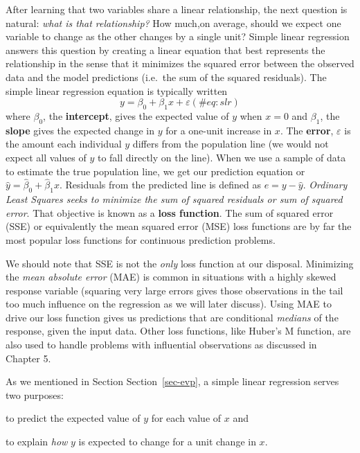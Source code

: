 \documentclass[
  letterpaper,
  DIV=11,
  numbers=noendperiod]{scrreprt}
\begin{document}
After learning that two variables share a linear relationship, the next
question is natural: \emph{what is that relationship?} How much,on
average, should we expect one variable to change as the other changes by
a single unit? Simple linear regression answers this question by
creating a linear equation that best represents the relationship in the
sense that it minimizes the squared error between the observed data and
the model predictions (i.e.~the sum of the squared residuals). The
simple linear regression equation is typically written \begin{equation}
y=\beta_0 + \beta_1x + \varepsilon
(\#eq:slr)
\end{equation} where \(\beta_0\), the \textbf{intercept}, gives the
expected value of \(y\) when \(x=0\) and \(\beta_1\), the \textbf{slope}
gives the expected change in \(y\) for a one-unit increase in \(x\). The
\textbf{error}, \(\varepsilon\) is the amount each individual \(y\)
differs from the population line (we would not expect all values of
\(y\) to fall directly on the line). When we use a sample of data to
estimate the true population line, we get our prediction equation or
\(\hat{y}=\hat{\beta}_0 + \hat{\beta}_1x\). Residuals from the predicted
line is defined as \(e=y-\hat{y}\). \emph{Ordinary Least Squares seeks
to minimize the sum of squared residuals or sum of squared error}. That
objective is known as a \textbf{loss function}. The sum of squared error
(SSE) or equivalently the mean squared error (MSE) loss functions are by
far the most popular loss functions for continuous prediction problems.

We should note that SSE is not the \emph{only} loss function at our
disposal. Minimizing the \emph{mean absolute error} (MAE) is common in
situations with a highly skewed response variable (squaring very large
errors gives those observations in the tail too much influence on the
regression as we will later discuss). Using MAE to drive our loss
function gives us predictions that are conditional \emph{medians} of the
response, given the input data. Other loss functions, like Huber's M
function, are also used to handle problems with influential observations
as discussed in Chapter 5.

As we mentioned in Section Section~\ref{sec-evp}, a simple linear
regression serves two purposes:

to predict the expected value of \(y\) for each value of \(x\) and

to explain \emph{how} \(y\) is expected to change for a unit change in
\(x\).
\end{document}
